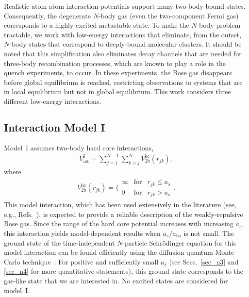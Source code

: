 \documentclass[aps,pra,twocolumn,showpacs,superscriptaddress]{revtex4}
\begin{document}
Realistic atom-atom interaction potentials support
many two-body bound states. 
Consequently,
the degenerate $N$-body gas 
(even the two-component Fermi gas) corresponds to a 
highly-excited metastable state.
To make the $N$-body problem tractable, we work with
low-energy interactions that eliminate, from the outset,
 $N$-body states that
correspond to deeply-bound molecular clusters.
It should be noted that this simplification also eliminates
decay channels that are needed for three-body recombination processes,
which are known to play
a role in the quench experiments, to occur.
In these experiments, 
the Bose gas disappears before global equilibrium is reached,
restricting observations to systems that are in local equilibrium but
not in global equilibrium.
This work considers three different low-energy interactions.


\subsection{Interaction Model I}
Model~I assumes two-body hard core interactions,
\begin{eqnarray}
V_{\text{int}}^{\text{I}} = \sum_{j=1}^{N-1} \sum_{k>j}^N V_{\text{2b}}^{\text{hc}}(r_{jk}),
\end{eqnarray}
where
\begin{eqnarray}
V_{\text{2b}}^{\text{hc}}(r_{jk}) =  \Big \{ \begin{array}{lll}
\infty & \mbox{for} & r_{jk} \le a_s \\
0 & \mbox{for} & r_{jk} > a_s \end{array}
.
\end{eqnarray} 
This model interaction, which has been used extensively
in the literature (see, e.g., 
Refs.~\cite{kalos1974,giorgini1999,blume2001}),
is expected to provide a reliable description
of the weakly-repulsive Bose gas.
Since the range of the hard core potential increases with
increasing $a_s$, this interaction yields model-dependent
results when $a_s/a_{\text{ho}}$ is not small. 
The ground state of the time-independent 
$N$-particle Schr\"odinger equation 
for this model interaction can be found efficiently
using the diffusion quantum Monte Carlo
technique~\cite{mcbook,blume2001}.
For positive and sufficiently small $a_s$ (see Secs.~\ref{sec_n3}
and \ref{sec_n4} for more quantitative
statements),
this ground state corresponds to
the gas-like state that we are interested in.
No excited states are considered for model~I.
\end{document}
